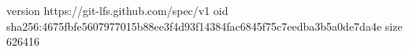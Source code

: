 version https://git-lfs.github.com/spec/v1
oid sha256:4675fbfe5607977015b88ee3f4d93f14384fac6845f75c7eedba3b5a0de7da4e
size 626416
